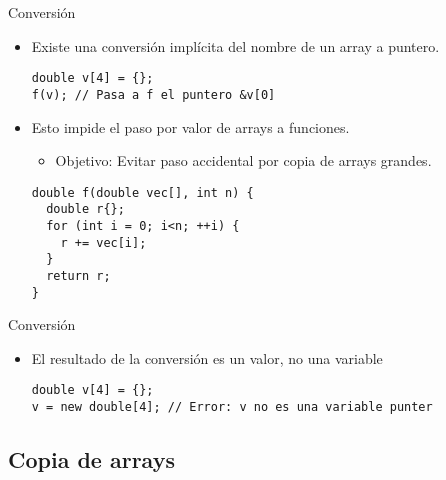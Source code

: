 \begin{frame}[fragile]{Conversión}
\begin{itemize}
  \item Existe una conversión implícita del nombre de un array a puntero.
\begin{lstlisting}
double v[4] = {};
f(v); // Pasa a f el puntero &v[0]
\end{lstlisting}
  \item Esto impide el paso por valor de arrays a funciones.
    \begin{itemize}
      \item Objetivo: Evitar paso accidental por copia de arrays grandes.
    \end{itemize}
\begin{lstlisting}
double f(double vec[], int n) {
  double r{};
  for (int i = 0; i<n; ++i) {
    r += vec[i];
  }
  return r;
}
\end{lstlisting}
\end{itemize}
\end{frame}

\begin{frame}[t,fragile]{Conversión}
\begin{itemize}
  \item El resultado de la conversión es un valor, no una variable
\begin{lstlisting}
double v[4] = {};
v = new double[4]; // Error: v no es una variable punter
\end{lstlisting}
\end{itemize}
\end{frame}

\subsection{Copia de arrays}

